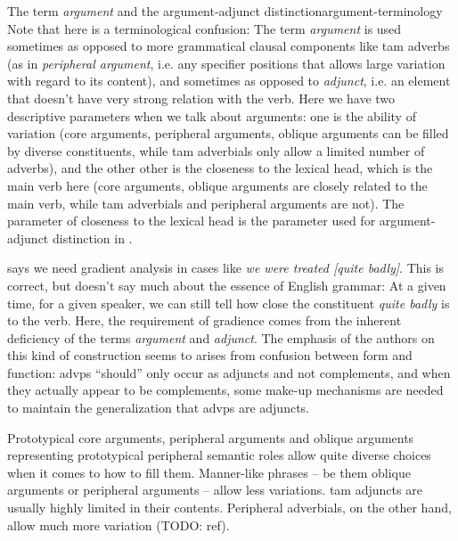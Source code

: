 \documentclass[UTF8, a4paper, oneside, scheme=plain, 12pt]{ctexbook}
\newcommand*{\citepage}[1]{p.~{#1}}
\newcommand*{\term}[1]{\emph{#1}}
\newcommand{\form}[1]{\emph{#1}}
\begin{document}
\begin{infobox}{The term \term{argument} and the argument-adjunct distinction}{argument-terminology}
    Note that here is a terminological confusion:
    The term \term{argument} is used sometimes 
    as opposed to more grammatical clausal components like \acs{tam} adverbs
    (as in \term{peripheral argument}, 
    i.e. any specifier positions that allows large variation with regard to its content),
    and sometimes as opposed to \term{adjunct},
    i.e. an element that doesn't have very strong relation with the verb.
    Here we have two descriptive parameters when we talk about arguments:
    one is the ability of variation
    (core arguments, peripheral arguments, oblique arguments can be filled by diverse constituents,
    while \acs{tam} adverbials only allow a limited number of adverbs),
    and the other other is the closeness to the lexical head, which is the main verb here 
    (core arguments, oblique arguments are closely related to the main verb,
    while \acs{tam} adverbials and peripheral arguments are not).
    The parameter of closeness to the lexical head is the parameter used for argument-adjunct distinction
    in .

    \citet[\citepage{732}]{quirk1985} says we need gradient analysis 
    in cases like \form{we were treated [quite badly]}.
    This is correct, but doesn't say much about the essence of English grammar:
    At a given time, for a given speaker,
    we can still tell how close the constituent \form{quite badly} is to the verb.
    Here, the requirement of gradience 
    comes from the inherent deficiency of the terms \term{argument} and \term{adjunct}. 
    The emphasis of the authors on this kind of construction 
    seems to arises from confusion between form and function:
    \acs{advp}s ``should'' only occur as adjuncts and not complements,
    and when they actually appear to be complements,
    some make-up mechanisms are needed to maintain the generalization that \acs{advp}s are adjuncts.
\end{infobox}

Prototypical core arguments,
peripheral arguments and oblique arguments representing prototypical peripheral semantic roles 
allow quite diverse choices when it comes to how to fill them.
Manner-like phrases -- be them oblique arguments or peripheral arguments -- 
allow less variations.
\acs{tam} adjuncts are usually highly limited in their contents.
Peripheral adverbials, on the other hand,
allow much more variation (TODO: ref).
\end{document}
